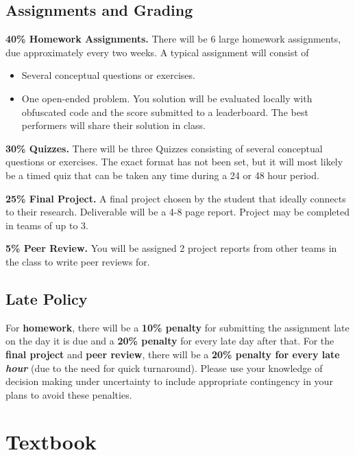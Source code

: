\documentclass[9pt]{article}
\begin{document}
\begin{samepage}
\section*{Assignments and Grading}

\textbf{40\% Homework Assignments.}
There will be 6 large homework assignments, due approximately every two weeks. A typical assignment will consist of
\begin{itemize}[nosep]
    \item Several conceptual questions or exercises.
    \item One open-ended problem. You solution will be evaluated locally with obfuscated code and the score submitted to a leaderboard. The best performers will share their solution in class.
\end{itemize}

\textbf{30\% Quizzes.}
There will be three Quizzes consisting of several conceptual questions or exercises. The exact format has not been set, but it will most likely be a timed quiz that can be taken any time during a 24 or 48 hour period.

\textbf{25\% Final Project.}
A final project chosen by the student that ideally connects to their research. Deliverable will be a 4-8 page report. Project may be completed in teams of up to 3.

\textbf{5\% Peer Review.}
You will be assigned 2 project reports from other teams in the class to write peer reviews for.
\end{samepage}

\subsection*{Late Policy}

For \textbf{homework}, there will be a \textbf{10\% penalty} for submitting the assignment late on the day it is due and a \textbf{20\% penalty} for every late day after that. For the \textbf{final project} and \textbf{peer review}, there will be a \textbf{20\% penalty for every late \emph{hour}} (due to the need for quick turnaround). Please use your knowledge of decision making under uncertainty to include appropriate contingency in your plans to avoid these penalties.

\section*{Textbook}
\end{document}
